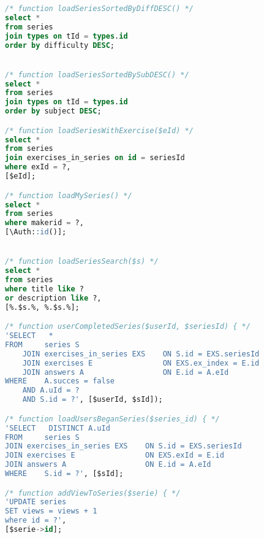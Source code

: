 \begin{lstlisting}[language=sql]
/* function loadSeriesSortedByDiffDESC() */
select *
from series
join types on tId = types.id
order by difficulty DESC;


/* function loadSeriesSortedBySubDESC() */
select *
from series
join types on tId = types.id
order by subject DESC;

/* function loadSeriesWithExercise($eId) */
select *
from series
join exercises_in_series on id = seriesId
where exId = ?,
[$eId];

/* function loadMySeries() */
select *
from series
where makerid = ?,
[\Auth::id()];


/* function loadSeriesSearch($s) */
select *
from series
where title like ?
or description like ?,
[%.$s.%, %.$s.%];

/* function userCompletedSeries($userId, $seriesId) { */
'SELECT   *
FROM     series S
    JOIN exercises_in_series EXS    ON S.id = EXS.seriesId
    JOIN exercises E                ON EXS.ex_index = E.id
    JOIN answers A                  ON E.id = A.eId
WHERE    A.succes = false
    AND A.uId = ?
    AND S.id = ?', [$userId, $sId]);

/* function loadUsersBeganSeries($series_id) { */
'SELECT   DISTINCT A.uId
FROM     series S
JOIN exercises_in_series EXS    ON S.id = EXS.seriesId
JOIN exercises E                ON EXS.exId = E.id
JOIN answers A                  ON E.id = A.eId
WHERE    S.id = ?', [$sId];

/* function addViewToSeries($serie) { */
'UPDATE series
SET views = views + 1
where id = ?',
[$serie->id];

\end{lstlisting}
